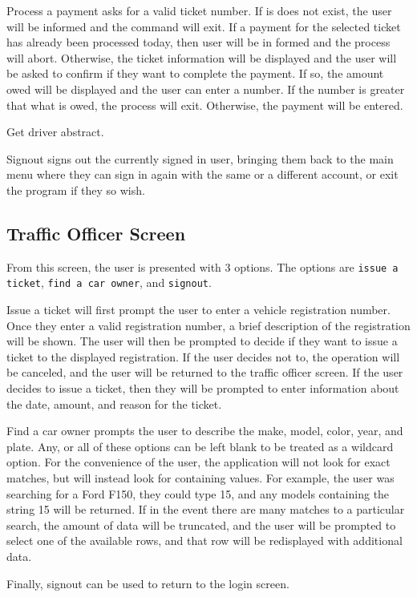 Process a payment asks for a valid ticket number. If is does not exist, the user
will be informed and the command will exit. If a payment for the selected ticket
has already been processed today, then user will be in formed and the process will
abort. Otherwise, the ticket information will be displayed and the user will be
asked to confirm if they want to complete the payment. If so, the amount owed will
be displayed and the user can enter a number. If the number is greater that what is
owed, the process will exit. Otherwise, the payment will be entered.

Get driver abstract.

Signout signs out the currently signed in user, bringing them back to the main
menu where they can sign in again with the same or a different account, or exit
the program if they so wish.


\subsection{Traffic Officer Screen}

From this screen, the user is presented with 3 options. The options are
\verb|issue a ticket|, \verb|find a car owner|, and \verb|signout|.

Issue a ticket will first prompt the user to enter a vehicle registration
number. Once they enter a valid registration number, a brief description of the
registration will be shown. The user will then be prompted to decide if they
want to issue a ticket to the displayed registration. If the user decides not
to, the operation will be canceled, and the user will be returned to the
traffic officer screen. If the user decides to issue a ticket, then they will
be prompted to enter information about the date, amount, and reason for the
ticket.

Find a car owner prompts the user to describe the make, model, color, year, and
plate. Any, or all of these options can be left blank to be treated as a
wildcard option. For the convenience of the user, the application will not look
for exact matches, but will instead look for containing values. For example, the
user was searching for a Ford F150, they could type 15, and any models
containing the string 15 will be returned. If in the event there are many
matches to a particular search, the amount of data will be truncated, and the
user will be prompted to select one of the available rows, and that row will be
redisplayed with additional data.

Finally, signout can be used to return to the login screen.

